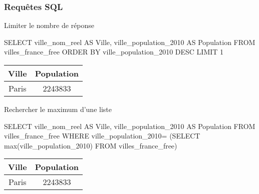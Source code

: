 \begin{frame}[fragile]
\frametitle{Requêtes SQL}

Limiter le nombre de réponse

\begin{minipage}{0.7\linewidth}
\begin{GrayBox}[0.85\textwidth]
\begin{semiverbatim}\small
SELECT ville_nom_reel AS Ville,
    ville_population_2010 AS Population
FROM villes_france_free
ORDER BY ville_population_2010 DESC LIMIT 1
\end{semiverbatim}
\end{GrayBox}
\end{minipage}\hfill
\begin{minipage}{0.25\linewidth}
\begin{center}
\begin{tabular}{|c|c|}
\hline
\textbf{Ville} & \textbf{Population} \\
\hline
Paris & 2243833 \\
\hline
\end{tabular}
\end{center}
\end{minipage}

Rechercher le maximum d'une liste

\begin{minipage}{0.7\linewidth}
\begin{GrayBox}[0.9\textwidth]
\begin{semiverbatim}\small
SELECT ville_nom_reel AS Ville,
    ville_population_2010 AS Population
FROM villes_france_free
WHERE ville_population_2010=
    (SELECT max(ville_population_2010)
        FROM villes_france_free)
\end{semiverbatim}
\end{GrayBox}
\end{minipage}\hfill
\begin{minipage}{0.25\linewidth}
\begin{center}
\begin{tabular}{|c|c|}
\hline
\textbf{Ville} & \textbf{Population} \\
\hline
Paris & 2243833 \\
\hline
\end{tabular}
\end{center}
\end{minipage}
\end{frame}

